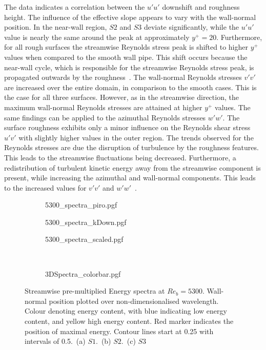 The data indicates a correlation between the $u'u'$ downshift and roughness height. 
The influence of the effective slope appears to vary with the wall-normal position. 
In the near-wall region, $S2$ and $S3$ deviate significantly, while the $u'u'$ value is nearly the same around the peak at approximately $y^+ = 20$.
Furthermore, for all rough surfaces the streamwise Reynolds stress peak is shifted to higher $y^+$ values when compared to the smooth wall pipe.
This shift occurs because the near-wall cycle, which is responsible for the streamwise Reynolds stress peak, is propagated outwards by the roughness~\citep{macdonaldTurbulentFlowTransitionally2016}.
The wall-normal Reynolds stresses $v'v'$ are increased over the entire domain, in comparison to the smooth cases.
This is the case for all three surfaces.
However, as in the streamwise direction, the maximum wall-normal Reynolds stresses are attained at higher $y^+$ values.
The same findings can be applied to the azimuthal Reynolds stresses $w'w'$.
The surface roughness exhibits only a minor influence on the Reynolds shear stress $u'v'$ with slightly higher values in the outer region.
The trends observed for the Reynolds stresses are due the disruption of turbulence by the roughness features.
This leads to the streamwise fluctuations being decreased.
Furthermore, a redistribution of turbulent kinetic energy away from the streamwise component is present, while increasing the azimuthal and wall-normal components.
This leads to the increased values for $v'v'$ and $w'w'$~\citep{chatzikyriakouDNSTurbulentFlow2015}.

\begin{figure}[h!]
    \centering
    \begin{subfigure}{0.495\textwidth}
    \subcaption{}
        {5300_spectra_piro.pgf}
    \end{subfigure}
    \hfill
    \begin{subfigure}{0.495\textwidth}
        \subcaption{}
        {5300_spectra_kDown.pgf}
    \end{subfigure}
    \centering
    \begin{subfigure}{0.495\textwidth}
        \subcaption{}
        {5300_spectra_scaled.pgf}
    \end{subfigure}
    \centering
    \\[5pt]
    \begin{subfigure}{\textwidth}
        \centering
        \hspace{0.9cm}
        {3DSpectra_colorbar.pgf}
    \end{subfigure}
    \caption[Streamwise energy spectra at $Re_b = 5300$]{Streamwise pre-multiplied Energy spectra at $Re_b = 5300$. Wall-normal position plotted over non-dimensionalised wavelength. Colour denoting energy content, with blue indicating low energy content, and yellow high energy content. Red marker indicates the position of maximal energy. Contour lines start at 0.25 with intervals of 0.5.~(a) $S1$.~(b) $S2$.~(c) $S3$}
    \label{fig: Reb5300 energy spectra}
\end{figure}

